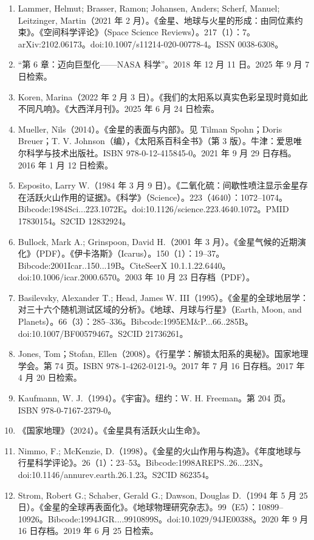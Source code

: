 \begin{enumerate}
\item Lammer, Helmut; Brasser, Ramon; Johansen, Anders; Scherf, Manuel; Leitzinger, Martin（2021 年 2 月）。《金星、地球与火星的形成：由同位素约束》。《空间科学评论》（Space Science Reviews）。217（1）：7。arXiv:2102.06173。doi:10.1007/s11214-020-00778-4。ISSN 0038-6308。
\item “第 6 章：迈向巨型化——NASA 科学”。2018 年 12 月 11 日。2025 年 9 月 7 日检索。
\item Koren, Marina（2022 年 2 月 3 日）。《我们的太阳系以真实色彩呈现时竟如此不同凡响》。《大西洋月刊》。2025 年 6 月 24 日检索。
\item Mueller, Nils（2014）。《金星的表面与内部》。见 Tilman Spohn；Doris Breuer；T. V. Johnson（编），《太阳系百科全书》（第 3 版）。牛津：爱思唯尔科学与技术出版社。ISBN 978-0-12-415845-0。2021 年 9 月 29 日存档。2016 年 1 月 12 日检索。
\item Esposito, Larry W.（1984 年 3 月 9 日）。《二氧化硫：间歇性喷注显示金星存在活跃火山作用的证据》。《科学》（Science）。223（4640）：1072–1074。Bibcode:1984Sci...223.1072E。doi:10.1126/science.223.4640.1072。PMID 17830154。S2CID 12832924。
\item Bullock, Mark A.; Grinspoon, David H.（2001 年 3 月）。《金星气候的近期演化》（PDF）。《伊卡洛斯》（Icarus）。150（1）：19–37。Bibcode:2001Icar..150...19B。CiteSeerX 10.1.1.22.6440。doi:10.1006/icar.2000.6570。2003 年 10 月 23 日存档（PDF）。
\item Basilevsky, Alexander T.; Head, James W. III（1995）。《金星的全球地层学：对三十六个随机测试区域的分析》。《地球、月球与行星》（Earth, Moon, and Planets）。66（3）：285–336。Bibcode:1995EM&P...66..285B。doi:10.1007/BF00579467。S2CID 21736261。
\item Jones, Tom；Stofan, Ellen（2008）。《行星学：解锁太阳系的奥秘》。国家地理学会。第 74 页。ISBN 978-1-4262-0121-9。2017 年 7 月 16 日存档。2017 年 4 月 20 日检索。
\item Kaufmann, W. J.（1994）。《宇宙》。纽约：W. H. Freeman。第 204 页。ISBN 978-0-7167-2379-0。
\item 《国家地理》（2024）。《金星具有活跃火山生命》。
\item Nimmo, F.; McKenzie, D.（1998）。《金星的火山作用与构造》。《年度地球与行星科学评论》。26（1）：23–53。Bibcode:1998AREPS..26...23N。doi:10.1146/annurev.earth.26.1.23。S2CID 862354。
\item Strom, Robert G.; Schaber, Gerald G.; Dawson, Douglas D.（1994 年 5 月 25 日）。《金星的全球再表面化》。《地球物理研究杂志》。99（E5）：10899–10926。Bibcode:1994JGR....9910899S。doi:10.1029/94JE00388。2020 年 9 月 16 日存档。2019 年 6 月 25 日检索。

\end{enumerate}
